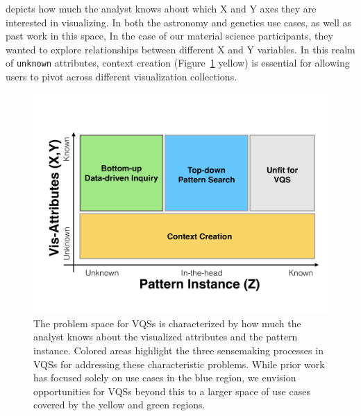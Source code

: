 depicts how much the analyst
knows about which X and Y axes
they are interested in visualizing.
In both the astronomy and genetics use cases,
as well as past work in this space, %
In the case of our material science participants,
they wanted to explore relationships between different
X and Y variables.
In this realm of \texttt{unknown} attributes,
context creation (Figure~\ref{2dmodel} yellow) is
essential for allowing users
to pivot across different visualization collections.%
\begin{figure}[h!]
  \centering
  \includegraphics[width=0.9\linewidth]{figures/2dmodel.pdf}
  \caption{The problem space for VQSs is characterized by how much the analyst knows about the visualized attributes and the pattern instance. Colored areas highlight the three sensemaking processes in VQSs for addressing these characteristic problems. While prior work has focused solely on use cases in the blue region, we envision opportunities for VQSs beyond this to a larger space of use cases covered by the yellow and green regions.}
  \label{2dmodel}
  \vspace{-10pt}
\end{figure}
